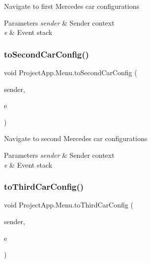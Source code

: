 Navigate to first Mercedes car configurations 


\begin{DoxyParams}{Parameters}
{\em sender} & Sender context\\
\hline
{\em e} & Event stack\\
\hline
\end{DoxyParams}
\mbox{\label{class_project_app_1_1_menu_a291218bd9dd354099029bc7e903805e7}} 
\subsubsection{\texorpdfstring{to\+Second\+Car\+Config()}{toSecondCarConfig()}}
{\footnotesize\ttfamily void Project\+App.\+Menu.\+to\+Second\+Car\+Config (\begin{DoxyParamCaption}\item[{object}]{sender,  }\item[{Routed\+Event\+Args}]{e }\end{DoxyParamCaption})\hspace{0.3cm}{\ttfamily [private]}}



Navigate to second Mercedes car configurations 


\begin{DoxyParams}{Parameters}
{\em sender} & Sender context\\
\hline
{\em e} & Event stack\\
\hline
\end{DoxyParams}
\mbox{\label{class_project_app_1_1_menu_a10a17db1b9768e86d56c71cae5f54066}} 
\subsubsection{\texorpdfstring{to\+Third\+Car\+Config()}{toThirdCarConfig()}}
{\footnotesize\ttfamily void Project\+App.\+Menu.\+to\+Third\+Car\+Config (\begin{DoxyParamCaption}\item[{object}]{sender,  }\item[{Routed\+Event\+Args}]{e }\end{DoxyParamCaption})\hspace{0.3cm}{\ttfamily [private]}}



